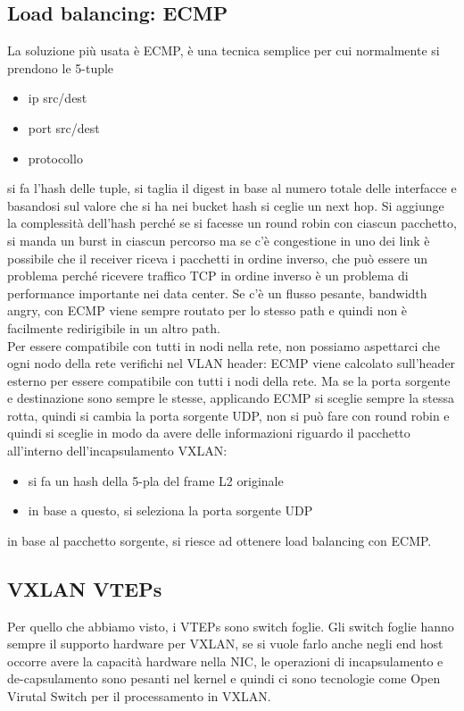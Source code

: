 \documentclass[12pt, oneside]{extbook} %
\begin{document}
\subsection{Load balancing: ECMP}
La soluzione più usata è ECMP, è una tecnica semplice per cui normalmente si prendono le 5-tuple
\begin{itemize}
\item ip src/dest
\item port src/dest
\item protocollo
\end{itemize}
si fa l'hash delle tuple, si taglia il digest in base al numero totale delle interfacce e basandosi sul valore che si ha nei bucket hash si ceglie un next hop. Si aggiunge la complessità dell'hash perché se si facesse un round robin con ciascun pacchetto, si manda un burst in ciascun percorso ma se c'è congestione in uno dei link è possibile che il receiver riceva i pacchetti in ordine inverso, che può essere un problema perché ricevere traffico TCP in ordine inverso è un problema di performance importante nei data center. Se c'è un flusso pesante, bandwidth angry, con ECMP viene sempre routato per lo stesso path e quindi non è facilmente redirigibile in un altro path.\\Per essere compatibile con tutti in nodi nella rete, non possiamo aspettarci che ogni nodo della rete verifichi nel VLAN header: ECMP viene calcolato sull'header esterno per essere compatibile con tutti i nodi della rete. Ma se la porta sorgente e destinazione sono sempre le stesse, applicando ECMP si sceglie sempre la stessa rotta, quindi si cambia la porta sorgente UDP, non si può fare con round robin e quindi si sceglie in modo da avere delle informazioni riguardo il pacchetto all'interno dell'incapsulamento VXLAN:
\begin{itemize}
\item si fa un hash della 5-pla del frame L2 originale
\item in base a questo, si seleziona la porta sorgente UDP
\end{itemize}
in base al pacchetto sorgente, si riesce ad ottenere load balancing con ECMP.
\subsection{VXLAN VTEPs}
Per quello che abbiamo visto, i VTEPs sono switch foglie. Gli switch foglie hanno sempre il supporto hardware per VXLAN, se si vuole farlo anche negli end host occorre avere la capacità hardware nella NIC, le operazioni di incapsulamento e de-capsulamento sono pesanti nel kernel e quindi ci sono tecnologie come Open Virutal Switch per il processamento in VXLAN.
\end{document}
